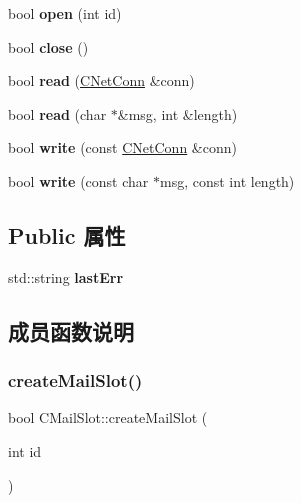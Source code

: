 \begin{DoxyCompactItemize}
\mbox{\label{class_c_mail_slot_a23a09f6261450e62570ee1314c62eb97}} 
bool {\bfseries open} (int id)
\item 
\mbox{\label{class_c_mail_slot_afc370072c2ab921ba66c55d1509262ad}} 
bool {\bfseries close} ()
\item 
\mbox{\label{class_c_mail_slot_a8eb1b3b7bd937365ca865d76e25a4941}} 
bool {\bfseries read} (\hyperlink{class_c_net_conn}{C\+Net\+Conn} \&conn)
\item 
\mbox{\label{class_c_mail_slot_a17b53bd1601b38ba99bac0dda7ac0794}} 
bool {\bfseries read} (char $\ast$\&msg, int \&length)
\item 
\mbox{\label{class_c_mail_slot_a5eb6d0ece129a9c023cd058f45653427}} 
bool {\bfseries write} (const \hyperlink{class_c_net_conn}{C\+Net\+Conn} \&conn)
\item 
\mbox{\label{class_c_mail_slot_add3c2a84d9d2e588f23e009c08c0ca2d}} 
bool {\bfseries write} (const char $\ast$msg, const int length)
\end{DoxyCompactItemize}
\subsection*{Public 属性}
\begin{DoxyCompactItemize}
\item 
\mbox{\label{class_c_mail_slot_a4e3521651dae10b64456ad61b2612009}} 
std\+::string {\bfseries last\+Err}
\end{DoxyCompactItemize}


\subsection{成员函数说明}
\mbox{\label{class_c_mail_slot_abdbc8ae85a1ae1f7c7998c43b1422535}} 
\subsubsection{\texorpdfstring{create\+Mail\+Slot()}{createMailSlot()}\hspace{0.1cm}{\footnotesize\ttfamily [1/2]}}
{\footnotesize\ttfamily bool C\+Mail\+Slot\+::create\+Mail\+Slot (\begin{DoxyParamCaption}\item[{int}]{id }\end{DoxyParamCaption})}



